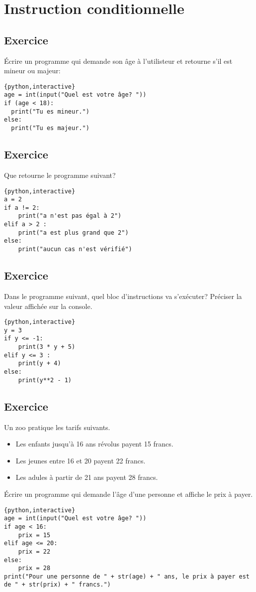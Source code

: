 \documentclass[a4paper,11pt]{article}
\begin{document}
\section{Instruction conditionnelle}

\subsection{Exercice}
Écrire un programme qui demande son âge à l'utilisteur et retourne s'il est mineur ou majeur:\\
\begin{solution}
\begin{verbatim}{python,interactive}
age = int(input("Quel est votre âge? "))
if (age < 18):
  print("Tu es mineur.")
else:
  print("Tu es majeur.")
\end{verbatim}
\end{solution}

\subsection{Exercice}
Que retourne le programme suivant?
\begin{verbatim}{python,interactive}
a = 2
if a != 2:
    print("a n'est pas égal à 2")
elif a > 2 :
    print("a est plus grand que 2")
else:
    print("aucun cas n'est vérifié")
\end{verbatim}

\subsection{Exercice}
Dans le programme suivant, quel bloc d'instructions va s'exécuter? Préciser la valeur affichée sur la console.
\begin{verbatim}{python,interactive}
y = 3
if y <= -1:
    print(3 * y + 5)
elif y <= 3 :
    print(y + 4)
else:
    print(y**2 - 1)
\end{verbatim}

\subsection{Exercice}
Un zoo pratique les tarifs suivants.\\
\begin{itemize}
    \item Les enfants jusqu'à 16 ans révolus payent 15 francs.
    \item Les jeunes entre 16 et 20 payent 22 francs.
    \item Les adules à partir de 21 ans payent 28 francs.
\end{itemize}
Écrire un programme qui demande l'âge d'une personne et affiche le prix à payer.
\begin{solution}
\begin{verbatim}{python,interactive}
age = int(input("Quel est votre âge? "))
if age < 16:
    prix = 15
elif age <= 20:
    prix = 22
else:
    prix = 28
print("Pour une personne de " + str(age) + " ans, le prix à payer est de " + str(prix) + " francs.")
\end{verbatim}
\end{solution}
\end{document}
